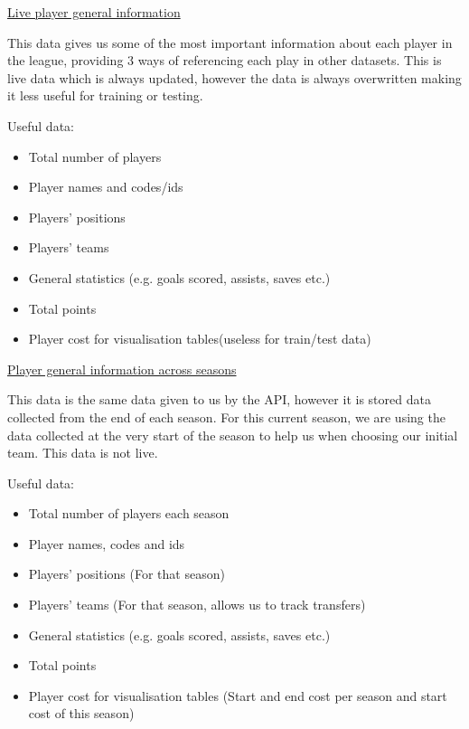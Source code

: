 \documentclass[12pt, a4paper, oneside]{book}
\numberwithin{equation}{section}
\begin{document}
\href{https://fantasy.premierleague.com/api/bootstrap-static/}{Live player general information}

\vspace{0.5cm}

This data gives us some of the most important information about each player in the league, providing 3 ways of referencing each play in other datasets. This is live data which is always updated, however the data is always overwritten making it less useful for training or testing. 

\vspace{0.5cm}

Useful data:

\begin{itemize}
  \item Total number of players
  \item Player names and codes/ids
  \item Players' positions
  \item Players' teams
  \item General statistics (e.g. goals scored, assists, saves etc.)
  \item Total points
  \item Player cost for visualisation tables(useless for train/test data)
\end{itemize}

\vspace{0.5cm}

\href{https://github.com/vaastav/Fantasy-Premier-League/blob/master/data/2021-22/players_raw.csv}{Player general information across seasons}

\vspace{0.5cm}

This data is the same data given to us by the API, however it is stored data collected from the end of each season. For this current season, we are using the data collected at the very start of the season to help us when choosing our initial team. This data is not live.

\vspace{0.5cm}

Useful data:

\begin{itemize}
  \item Total number of players each season
  \item Player names, codes and ids
  \item Players' positions (For that season)
  \item Players' teams (For that season, allows us to track transfers)
  \item General statistics (e.g. goals scored, assists, saves etc.)
  \item Total points
  \item Player cost for visualisation tables (Start and end cost per season and start cost of this season)
\end{itemize}
\end{document}
